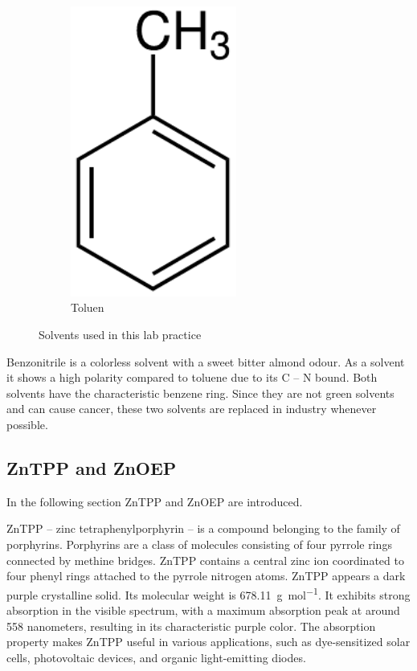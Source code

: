 \begin{figure}[h]
\begin{subfigure}[b]{0.3\textwidth}
      \includegraphics[width = 0.6\textwidth]{Bilder/Grundlagen/Toluen.pdf}      
      \caption{Toluen}
      \label{fig:Tol}
    \end{subfigure}
    \caption{Solvents used in this lab practice}
    \label{fig:Solvents}
\end{figure}

Benzonitrile is a colorless solvent with a sweet bitter almond odour. As a solvent it shows a high polarity compared to toluene due to its C -- N bound. 
Both solvents have the characteristic benzene ring. Since they are not green solvents and can cause cancer, these two solvents are replaced in industry whenever possible. 

\subsection{ZnTPP and ZnOEP}
\label{subsec:ZnTPPZnOEP}

In the following section ZnTPP and ZnOEP are introduced.

ZnTPP -- zinc tetraphenylporphyrin -- is a compound belonging to the family of porphyrins. Porphyrins are a class of 
molecules consisting of four pyrrole rings connected by methine bridges. ZnTPP contains a central zinc ion coordinated to four phenyl rings attached
to the pyrrole nitrogen atoms.
ZnTPP appears a dark purple crystalline solid. Its molecular weight is \SI{678.11}{\gram\per\mol}. It exhibits strong absorption in the visible spectrum, with a maximum absorption peak at around 558 nanometers, resulting in its characteristic purple color.
The absorption property makes ZnTPP useful in various applications, such as dye-sensitized solar cells, photovoltaic devices, and organic light-emitting
diodes. 


